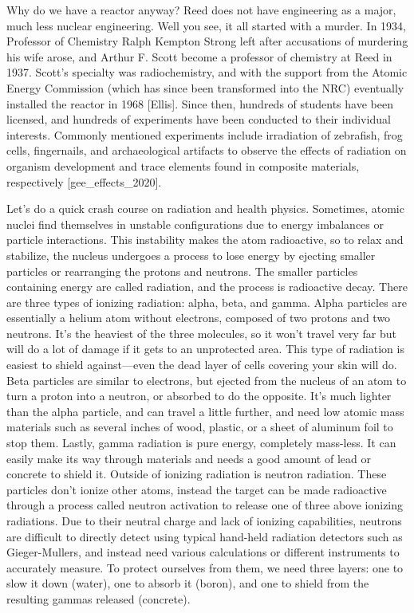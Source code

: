 \documentclass[12pt,twoside]{reedthesis}
\begin{document}
Why do we have a reactor anyway? Reed does not have engineering as a major, much less nuclear engineering. Well you see, it all started with a murder. In 1934, Professor of Chemistry Ralph Kempton Strong left after accusations of murdering his wife arose, and Arthur F. Scott become a professor of chemistry at Reed in 1937. Scott's specialty was radiochemistry, and with the support from the Atomic Energy Commission (which has since been transformed into the NRC) eventually installed the reactor in 1968 {[}Ellis{]}. Since then, hundreds of students have been licensed, and hundreds of experiments have been conducted to their individual interests. Commonly mentioned experiments include irradiation of zebrafish, frog cells, fingernails, and archaeological artifacts to observe the effects of radiation on organism development and trace elements found in composite materials, respectively {[}gee\_effects\_2020{]}.

Let's do a quick crash course on radiation and health physics. Sometimes, atomic nuclei find themselves in unstable configurations due to energy imbalances or particle interactions. This instability makes the atom radioactive, so to relax and stabilize, the nucleus undergoes a process to lose energy by ejecting smaller particles or rearranging the protons and neutrons. The smaller particles containing energy are called radiation, and the process is radioactive decay. There are three types of ionizing radiation: alpha, beta, and gamma. Alpha particles are essentially a helium atom without electrons, composed of two protons and two neutrons. It's the heaviest of the three molecules, so it won't travel very far but will do a lot of damage if it gets to an unprotected area. This type of radiation is easiest to shield against---even the dead layer of cells covering your skin will do. Beta particles are similar to electrons, but ejected from the nucleus of an atom to turn a proton into a neutron, or absorbed to do the opposite. It's much lighter than the alpha particle, and can travel a little further, and need low atomic mass materials such as several inches of wood, plastic, or a sheet of aluminum foil to stop them. Lastly, gamma radiation is pure energy, completely mass-less. It can easily make its way through materials and needs a good amount of lead or concrete to shield it. Outside of ionizing radiation is neutron radiation. These particles don't ionize other atoms, instead the target can be made radioactive through a process called neutron activation to release one of three above ionizing radiations. Due to their neutral charge and lack of ionizing capabilities, neutrons are difficult to directly detect using typical hand-held radiation detectors such as Gieger-Mullers, and instead need various calculations or different instruments to accurately measure. To protect ourselves from them, we need three layers: one to slow it down (water), one to absorb it (boron), and one to shield from the resulting gammas released (concrete).
\end{document}
